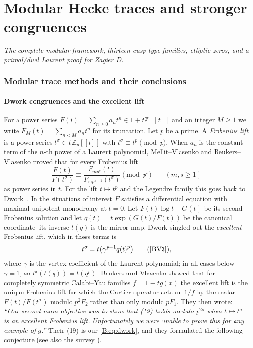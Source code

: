 \documentclass[11pt,a4paper]{article}
\theoremstyle{definition}\newtheorem{definition}[theorem]{Definition}
\theoremstyle{remark}\newtheorem{remark}[theorem]{Remark}
\newcommand{\Z}{\mathbb Z}
\numberwithin{equation}{section}
\newcommand{\partstart}[3]{\clearpage\part{#1}\label{#2}\noindent\textit{#3}\par\medskip}
\begin{document}

\partstart{Modular Hecke traces and stronger congruences}{part:modular}{The complete modular framework, thirteen cusp-type families, elliptic zeros, and a primal/dual Laurent proof for Zagier D.}
\section{Modular trace methods and their conclusions}\label{B:source-main-1}

\subsection{Dwork congruences and the excellent lift}
For a power series $F(t)=\sum_{n\ge0}a_nt^n\in1+t\Z[[t]]$ and an integer $M\ge1$ we write
$F_M(t)=\sum_{n<M}a_nt^n$ for its truncation. Let $p$ be a prime. A \emph{Frobenius lift} is a
power series $t^\sigma\in t\,\Z_p[[t]]$ with $t^\sigma\equiv t^p\pmod p$. When $a_n$ is the
constant term of the $n$-th power of a Laurent polynomial, Mellit--Vlasenko \cite{MV16} and
Beukers--Vlasenko \cite{BV1,BV3} proved that for every Frobenius lift
\begin{equation}\label{B:eq:dwork}
\frac{F(t)}{F(t^\sigma)}\equiv\frac{F_{mp^s}(t)}{F_{mp^{s-1}}(t^\sigma)}\pmod{p^s}
\qquad(m,s\ge1)
\end{equation}
as power series in $t$. For the lift $t\mapsto t^p$ and the Legendre family this goes back to
Dwork~\cite{Dw69}. In the situations of interest $F$ satisfies a differential equation with maximal
unipotent monodromy at $t=0$. Let $F(t)\log t+G(t)$ be its second Frobenius solution and let
$q(t)=t\exp(G(t)/F(t))$ be the canonical coordinate; its inverse $t(q)$ is the mirror map. Dwork
singled out the \emph{excellent} Frobenius lift, which in these terms is
\[
t^\sigma=t\bigl(\gamma^{p-1}q(t)^p\bigr)\qquad\text{(\cite[Def.~7.14]{BV3})},
\]
where $\gamma$ is the vertex coefficient of the Laurent polynomial; in all cases below
$\gamma=1$, so $t^\sigma(t(q))=t(q^p)$. Beukers and Vlasenko \cite[Thm.~7.3]{BV3} showed that for
completely symmetric Calabi--Yau families $f=1-tg(x)$ the excellent lift is the unique Frobenius
lift for which the Cartier operator acts on $1/f$ by the scalar $F(t)/F(t^\sigma)$ modulo
$p^2F_2$ rather than only modulo $pF_1$. They then wrote: \emph{``Our second main objective was to
show that (19) holds modulo $p^{2s}$ when $t\mapsto t^\sigma$ is an excellent Frobenius lift.
Unfortunately we were unable to prove this for any example of $g$.''} Their (19) is our
\eqref{B:eq:dwork}, and they formulated the following conjecture (see also the survey \cite{Vl24}).
\end{document}
